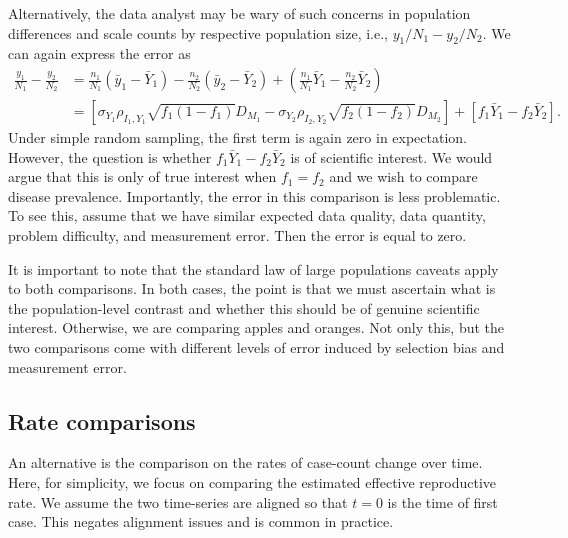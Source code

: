 \documentclass[aoas]{amsart}
\begin{document}
Alternatively, the data analyst may be wary of such concerns in population differences and scale counts by respective population size, i.e., $y_1/N_1 - y_2/ N_2$.  We can again express the error as
$$
\begin{aligned}
\frac{y_1}{N_1} - \frac{y_2}{N_2} &= \frac{n_1}{N_1} ( \bar y_1 - \bar Y_{1}) - \frac{n_2}{N_2} ( \bar y_2 - \bar Y_{2}) + \left( \frac{n_1}{N_1} \bar Y_{1} - \frac{n_2}{N_2} \bar Y_2  \right) \\
&= \left[ \sigma_{Y_1} \rho_{I_1, Y_1} \sqrt{ f_1 (1-f_1) } D_{M_1} - \sigma_{Y_2} \rho_{I_2, Y_2} \sqrt{f_2 (1-f_2)} D_{M_2} \right] + \left[ f_1 \bar Y_1 - f_2 \bar Y_2 \right].
\end{aligned}
$$
Under simple random sampling, the first term is again zero in expectation.  However, the question is whether $f_1 \bar Y_1 - f_2 \bar Y_2$ is of scientific interest.  We would argue that this is only of true interest when $f_1 = f_2$ and we wish to compare disease prevalence.  Importantly, the error in this comparison is less problematic.   To see this, assume that we have similar expected data quality, data quantity, problem difficulty, and measurement error.  Then the error is equal to zero.

It is important to note that the standard law of large populations caveats apply to both comparisons.  In both cases, the point is that we must ascertain what is the population-level contrast and whether this should be of genuine scientific interest. Otherwise, we are comparing apples and oranges.  Not only this, but the two comparisons come with different levels of error induced by selection bias and measurement error.

\subsection{Rate comparisons}

An alternative is the comparison on the rates of case-count change over time.  Here, for simplicity, we focus on comparing the estimated effective reproductive rate.  We assume the two time-series are aligned so that $t=0$ is the time of first case.  This negates alignment issues and is common in practice.
\end{document}
